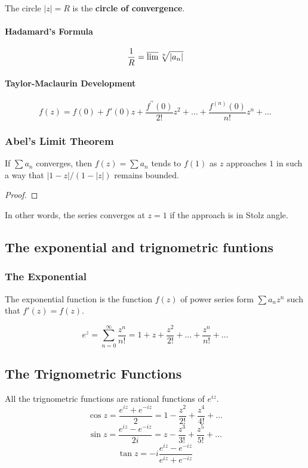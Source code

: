 The circle $|z| = R$ is the \textbf{circle of convergence}.
\paragraph{Hadamard's Formula}
\begin{equation}
	\frac{1}{R} = \varlimsup \sqrt[n]{|a_n|}
\end{equation}

\paragraph{Taylor-Maclaurin Development}
\begin{equation}
	f(z) = f(0) + f'(0)z + \frac{f^{\prime\prime}(0)}{2!}z^2 + \dots + \frac{f^{(n)}(0)}{n!}z^n + \dots 
\end{equation}

\subsubsection{Abel's Limit Theorem}
\begin{theorem}[Abel]
	If $\sum a_n$ converges, then $f(z) = \sum a_n$ tends to $f(1)$ as $z$ approaches $1$ in such a way that $|1-z|/(1-|z|)$ remains bounded.
\end{theorem}
\begin{proof}
\end{proof}

In other words, the series converges at $z=1$ if the approach is in Stolz angle.

\subsection{The exponential and trignometric funtions}
\subsubsection{The Exponential}
\begin{definition}
	The exponential function is the function $f(z)$ of power series form $\sum a_n z^n$ such that $f'(z) = f(z)$.
\end{definition}
\[ e^z = \sum_{n = 0}^\infty \frac{z^n}{n!} = 1 + z + \frac{z^2}{2!} + \dots + \frac{z^n}{n!} + \dots \]
\subsection{The Trignometric Functions}
All the trignometric functions are rational functions of $e^{iz}$.
\[ \cos z = \frac{e^{iz}+e^{-iz}}{2} = 1 - \frac{z^2}{2!} + \frac{z^4}{4!} + \dots \]
\[ \sin z = \frac{e^{iz}-e^{-iz}}{2i} = z - \frac{z^3}{3!} + \frac{z^5}{5!} + \dots \]
\[ \tan z = -i \frac{e^{iz}-e^{-iz}}{e^{iz}+e^{-iz}} \]

